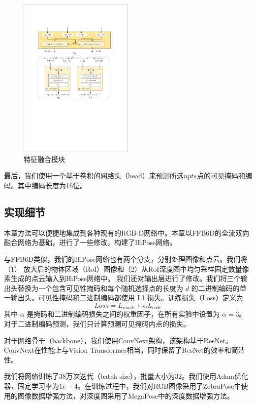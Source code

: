 \begin{figure}[htbp]
    \centering
    \includegraphics[width=0.5\textwidth]{figure/hipose/fuse.pdf}
    \caption{特征融合模块}
    \label{fig:fuse}
\end{figure}


最后，我们使用一个基于卷积的网络头（head）来预测所选$npts$点的可见掩码和编码。其中编码长度为16位。

\subsection{实现细节}\label{subsection:implementation_details}
本章方法可以便捷地集成到各种现有的RGB-D网络中。本章以FFB6D\cite{he2021ffb6d}的全流双向融合网络为基础，进行了一些修改，构建了HiPose网络。

与FFB6D类似，我们的HiPose网络也有两个分支，分别处理图像和点云。我们将（1） 放大后的物体区域（RoI）图像和（2）从RoI深度图中均匀采样固定数量像素生成的点云输入到HiPose网络中。
我们还对输出层进行了修改。我们将三个输出头替换为一个包含可见性掩码和每个随机选择点的长度为 $d$ 的二进制编码的单一输出头。可见性掩码和二进制编码都使用 L1 损失。训练损失（Loss）定义为
\begin{equation}
Loss = L_{mask} + \alpha L_{code}   
\end{equation}
其中 $\alpha$ 是掩码和二进制编码损失之间的权重因子，在所有实验中设置为 $\alpha = 3$。对于二进制编码预测，我们只计算预测可见掩码内点的损失。

对于网络骨干（backbone），我们使用ConvNext\cite{Liu2022ACF}架构，该架构基于ResNet\cite{He2015DeepRL}。ConvNext在性能上与Vision Transformer\cite{Dosovitskiy2020AnII}相当，同时保留了ResNet的效率和简洁性。

我们将网络训练了$38$万次迭代（batch size），批量大小为$32$。我们使用Adam\cite{Kingma2014AdamAM}优化器，固定学习率为$1e-4$。在训练过程中，我们对RGB图像采用了ZebraPose\cite{su2022zebrapose}中使用的图像数据增强方法，对深度图采用了MegaPose\cite{Labbe2022MegaPose6P}中的深度数据增强方法。

